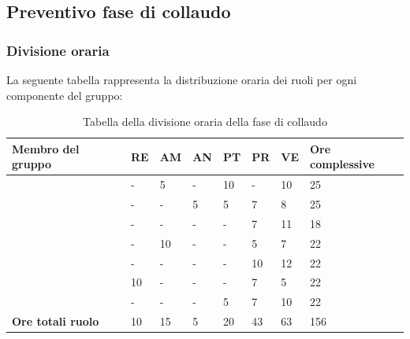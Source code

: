 \subsection{Preventivo fase di collaudo}

\subsubsection{Divisione oraria}
La seguente tabella rappresenta la distribuzione oraria dei ruoli per ogni componente del gruppo:
{

\renewcommand{\arraystretch}{2}
\begin{longtable}[h!] { C{3.5cm} C{1cm} C{1cm} C{1cm} C{1cm} C{1cm} C{1cm} C{2cm}}
\caption{Tabella della divisione oraria della fase di collaudo}	\\
\rowcolor{\primaryColor}

\textcolor{\secondaryColor}{\textbf{Membro del gruppo}} & 
\textcolor{\secondaryColor}{\textbf{RE}} & 
\textcolor{\secondaryColor}{\textbf{AM}} & 
\textcolor{\secondaryColor}{\textbf{AN}} & 
\textcolor{\secondaryColor}{\textbf{PT}} & 
\textcolor{\secondaryColor}{\textbf{PR}} & 
\textcolor{\secondaryColor}{\textbf{VE}} & 
\textcolor{\secondaryColor}{\textbf{Ore complessive}}\\	
\endhead

\AW{}                     &  - &  5 &  - & 10 & - & 10 & 25 \\
\AT{}                     &  - &  - &  5 & 5 & 7 & 8 & 25 \\
\AD{}                     &  - &  - &  - & - & 7 & 11 & 18 \\
\EC{}                     &  - &  10 &  - & - & 5 & 7 & 22 \\
\EM{}                     &  - &  - &  - & - & 10 & 12 & 22 \\
\FP{}                     & 10 & - &  - & - & 7 & 5 & 22 \\
\GG{}                     &  - &  - &  - & 5 & 7 & 10 & 22 \\
\textbf{Ore totali ruolo} & 10 & 15 & 5 & 20 & 43 & 63 & 156 \\

\end{longtable}
}


